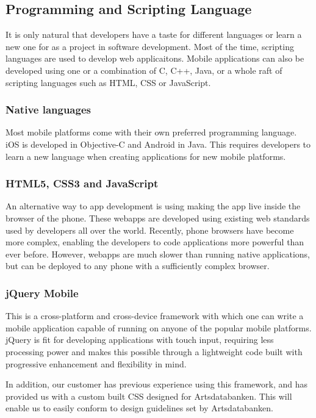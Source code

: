 \subsection{Programming and Scripting Language}
It is only natural that developers have a taste for different languages or
learn a new one for as a project in software development. Most of the time,
scripting languages are used to develop web applicaitons. Mobile applications
can also be developed using one or a combination of C, C++, Java, or a whole raft of scripting languages such as HTML, CSS or JavaScript.

\subsubsection{Native languages}
Most mobile platforms come with their own preferred programming language. iOS is developed in Objective-C and Android in Java. This requires developers to learn a new language when creating applications for new mobile platforms.

\subsubsection{HTML5, CSS3 and JavaScript}
An alternative way to app development is using making the app live inside the browser of the phone. These webapps are developed using existing web standards used by developers all over the world. Recently, phone browsers have become more complex, enabling the developers to code applications more powerful than ever before. However, webapps are much slower than running native applications, but can be deployed to any phone with a sufficiently complex browser.

\subsubsection{jQuery Mobile}
This is a cross-platform and cross-device framework with which one can write
a mobile application capable of running on anyone of the popular mobile platforms.
jQuery is fit for developing applications with touch input, requiring
less processing power and  makes this possible through a lightweight code
built with progressive enhancement and flexibility in mind.

In addition, our customer has previous experience using this framework, and has provided us with a custom built CSS designed for Artsdatabanken. This will enable us to easily conform to design guidelines set by Artsdatabanken.

